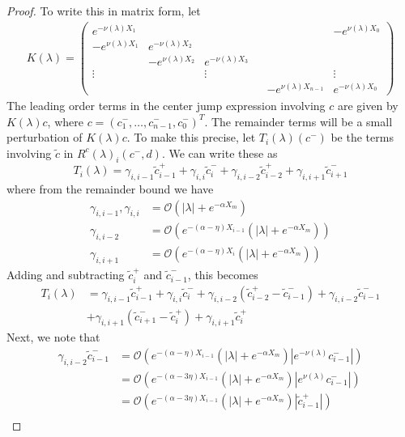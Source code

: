 \documentclass[thesis.tex]{subfiles}
\begin{document}
\begin{lemma}
\begin{proof}
To write this in matrix form, let
\begin{align*}
K(\lambda) =  
\begin{pmatrix}
e^{-\nu(\lambda)X_1} & & & & & -e^{\nu(\lambda)X_0} \\
-e^{\nu(\lambda)X_1} & e^{-\nu(\lambda)X_2} \\
& -e^{\nu(\lambda)X_2} & e^{-\nu(\lambda)X_3} \\
\vdots & & \vdots & &&  \vdots \\
& & & & -e^{\nu(\lambda)X_{n-1}} & e^{-\nu(\lambda)X_0} 
\end{pmatrix}
\end{align*}
The leading order terms in the center jump expression involving $c$ are given by $K(\lambda)c$, where $c = (c_1^-, \dots, c_{n-1}^-, c_0^-)^T$. The remainder terms will be a small perturbation of $K(\lambda)c$. To make this precise, let $T_i(\lambda)(c^-)$ be the terms involving $\tilde{c}$ in $R^c(\lambda)_i(c^-, d)$. We can write these as
\[
T_i(\lambda) = \gamma_{i,i-1} \tilde{c}_{i-1}^+ + \gamma_{i,i} \tilde{c}_{i}^- + \gamma_{i,i-2} \tilde{c}_{i-2}^+ + \gamma_{i,i+1} \tilde{c}_{i+1}^-
\] 
where from the remainder bound we have
\begin{align*}
\gamma_{i,i-1}, \gamma_{i,i} &= \mathcal{O}(|\lambda| + e^{-\alpha X_m}) \\
\gamma_{i,i-2} &= \mathcal{O}(e^{-(\alpha - \eta) X_{i-1}}(|\lambda| + e^{-\alpha X_m})) \\
\gamma_{i,i+1} &= \mathcal{O}(e^{-(\alpha - \eta) X_i}(|\lambda| + e^{-\alpha X_m}))
\end{align*}
Adding and subtracting $\tilde{c}_i^+$ and $\tilde{c}_{i-1}^-$, this becomes
\begin{align*}
T_i(\lambda) &= \gamma_{i,i-1} \tilde{c}_{i-1}^+ + \gamma_{i,i} \tilde{c}_{i}^- + \gamma_{i,i-2} ( \tilde{c}_{i-2}^+ - \tilde{c}_{i-1}^-) + \gamma_{i,i-2} \tilde{c}_{i-1}^- \\
& + \gamma_{i,i+1} (\tilde{c}_{i+1}^- - \tilde{c}_i^+) + \gamma_{i,i+1} \tilde{c}_i^+
\end{align*}
Next, we note that
\begin{align*}
\gamma_{i,i-2} \tilde{c}_{i-1}^- &= \mathcal{O}(e^{-(\alpha - \eta) X_{i-1}}(|\lambda| + e^{-\alpha X_m})|e^{-\nu(\lambda)}c_{i-1}^-|) \\
&= \mathcal{O}(e^{-(\alpha - 3 \eta) X_{i-1}}(|\lambda| + e^{-\alpha X_m})|e^{\nu(\lambda)}c_{i-1}^-|) \\
&= \mathcal{O}(e^{-(\alpha - 3 \eta) X_{i-1}}(|\lambda| + e^{-\alpha X_m})|\tilde{c}_{i-1}^+|) \\

\end{align*}
\end{proof}
\end{lemma}
\end{document}
